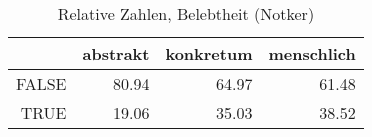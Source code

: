 \begin{table}[ht]
\centering
\begin{tabular}{rrrr}
  \hline
 & abstrakt & konkretum & menschlich \\ 
  \hline
FALSE & 80.94 & 64.97 & 61.48 \\ 
  TRUE & 19.06 & 35.03 & 38.52 \\ 
   \hline
\end{tabular}
\caption{Relative Zahlen, Belebtheit  (Notker)} 
\end{table}
